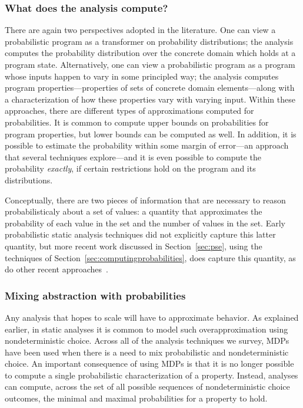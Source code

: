 \subsubsection{What does the analysis compute?}
There are again two perspectives adopted in the literature.
One can view a probabilistic program as a transformer on probability
distributions; the analysis computes the probability distribution over the
concrete domain which holds at a program state.
Alternatively, one can view a probabilistic program as a program 
whose inputs happen
to vary in some principled way; the analysis computes program 
properties---properties of sets of concrete domain elements---along with a characterization
of how these properties vary with varying input.
Within these approaches, there are different types of approximations
computed for probabilities.  It is common to compute upper bounds
on probabilities for program properties, but lower bounds can 
be computed as well.  In addition, it is possible to estimate the
probability within some margin of error---an approach that several
techniques explore---and it is even possible to compute the probability
\textit{exactly}, if certain restrictions hold on the program and its distributions.

Conceptually, there are two pieces of information that are necessary
to reason probabilisticaly about a set of values: a quantity
that approximates the probability of each value in the set 
and the number of values in the set.  
Early probabilistic static analysis
techniques did not explicitly capture this latter quantity, but
more recent work discussed in Section~\ref{sec:pse}, using the
techniques of Section~\ref{sec:computingprobabilities}, 
does capture this quantity, as do other
recent approaches~\cite{mardziel2013dynamic}.


\subsubsection{Mixing abstraction with probabilities}
Any analysis that hopes to scale will have to approximate
behavior.  As explained earlier, in static analyses it is common
to model such overapproximation using nondeterministic choice.
Across all of the analysis techniques we survey, MDPs
have been used when there is a need to mix probabilistic
and nondeterministic choice.   
An important consequence of using MDPs is that it is no longer possible
to compute a single probabilistic characterization of a property.
Instead, analyses can compute, across the set of all possible sequences
of nondeterministic choice outcomes, the minimal and maximal 
probabilities for a property to hold.
